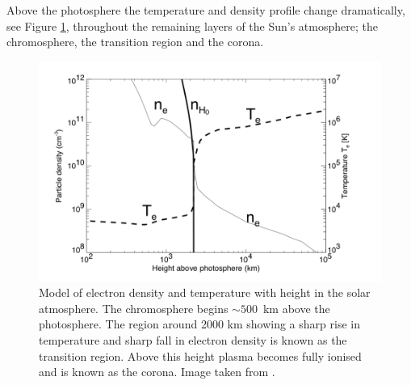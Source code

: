 Above the photosphere the temperature and density profile change dramatically, see Figure \ref{fig:corona_temp}, throughout the remaining layers of the Sun's atmosphere; the chromosphere, the transition region and the corona. 
\begin{figure}[ht]
    \centering
    \includegraphics[width=\columnwidth]{Images/Corona_temp.png}
    \caption[Model of electron density and temperature with height in the solar atmosphere.]{Model of electron density and temperature with height in the solar atmosphere. The chromosphere begins $\sim 500$~km above the photosphere. The region around 2000 km showing a sharp rise in temperature and sharp fall in electron density is known as the transition region. Above this height plasma becomes fully ionised and is known as the corona. Image taken from \cite{Aschwanden2004}.}
    \label{fig:corona_temp}
\end{figure}

